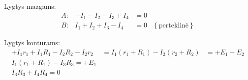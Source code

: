 \begin{exmp}
  Lygtys mazgams:
  \begin{align*}
    A: & -I_{1} - I_{2} - I_{3} + I_{4} &= 0 \\
    B: & I_{1} + I_{2} + I_{3} - I_{4} &= 0 &
      \left\{ \text{perteklinė} \right\}
  \end{align*}
  
  Lygtys kontūrams:
  \begin{align*}
    +I_{1}r_{1} + I_{1}R_{1} - I_{2}R_{2} - I_{2}r_{2} &=
      I_{1} (r_{1} + R_{1}) - I_{2} (r_{2} + R_{2}) &=
      + E_{1} - E_{2} \\
    I_{1} \left( r_{1} + R_{1} \right) - I_{3} R_{3} = + E_{1} \\
    I_{3} R_{3} + I_{4} R_{4} = 0
  \end{align*}
\end{exmp}
